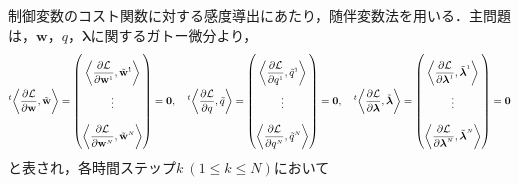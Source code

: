 \documentclass[a4paper,xelatex,ja=standard]{bxjsarticle}
\begin{document}
制御変数のコスト関数に対する感度導出にあたり，随伴変数法を用いる．主問題は，$\mathbf{w}$，$q$，$\boldsymbol{\lambda}$に関するガトー微分より，
\begin{equation}
    \everymath{\displaystyle}
    \setlength{\arraycolsep}{0.5pt}
    \renewcommand{\arraystretch}{2.5}
    \label{eq:main_problem}
    {}^{t}\!\left\langle\frac{\partial \mathcal{L}}{\partial \mathbf{w}}, \tilde{\mathbf{w}}\right\rangle
    = \begin{pmatrix}
        \left\langle\frac{\partial \mathcal{L}}{\partial \mathbf{w}^{\scriptscriptstyle 1}}, \tilde{\mathbf{w}}^{\scriptscriptstyle 1}\right\rangle \\
        \vdots \\
        \left\langle\frac{\partial \mathcal{L}}{\partial \mathbf{w}^{\scriptscriptstyle N}}, \tilde{\mathbf{w}}^{\scriptscriptstyle N}\right\rangle 
    \end{pmatrix}
    =\mathbf{0}
    ,\quad
    {}^{t}\!\left\langle\frac{\partial \mathcal{L}}{\partial q}, \tilde{q}\right\rangle
    = \begin{pmatrix}
        \left\langle\frac{\partial \mathcal{L}}{\partial q^{\scriptscriptstyle 1}}, \tilde{q}^{\scriptscriptstyle 1}\right\rangle \\
        \vdots \\
        \left\langle\frac{\partial \mathcal{L}}{\partial q^{\scriptscriptstyle N}}, \tilde{q}^{\scriptscriptstyle N}\right\rangle 
    \end{pmatrix}
    =\mathbf{0}
    ,\quad
    {}^{t}\!\left\langle\frac{\partial \mathcal{L}}{\partial \boldsymbol{\lambda}}, \tilde{\boldsymbol{\lambda}}\right\rangle
    = \begin{pmatrix}
        \left\langle\frac{\partial \mathcal{L}}{\partial \boldsymbol{\lambda}^{\scriptscriptstyle 1}}, \tilde{\boldsymbol{\lambda}}^{\scriptscriptstyle 1}\right\rangle \\
        \vdots \\
        \left\langle\frac{\partial \mathcal{L}}{\partial \boldsymbol{\lambda}^{\scriptscriptstyle N}}, \tilde{\boldsymbol{\lambda}}^{\scriptscriptstyle N}\right\rangle 
    \end{pmatrix}
    =\mathbf{0}
\end{equation}
と表され，各時間ステップ$k \ (1 \leq k \leq N)$において
\end{document}
